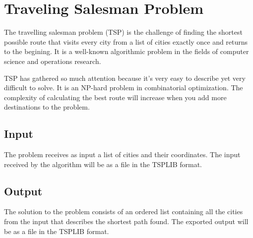 \chapter{Traveling Salesman Problem}

The travelling salesman problem (TSP) is the challenge of finding the shortest possible route that visits every city from a list of cities exactly once and returns to the begining. It is a well-known algorithmic problem in the fields of computer science and operations research.
\par
TSP has gathered so much attention because it's very easy to describe yet very difficult to solve. It is an NP-hard problem in combinatorial optimization. The complexity of calculating the best route will increase when you add more destinations to the problem. 

\section{Input}

The problem receives as input a list of cities and their coordinates. The input received by the algorithm will be as a file in the TSPLIB\cite{tsplib} format.  

\section{Output}

The solution to the problem consists of an ordered list containing all the cities from the input that describes the shortest path found.
The exported output will be as a file in the TSPLIB\cite{tsplib} format.

